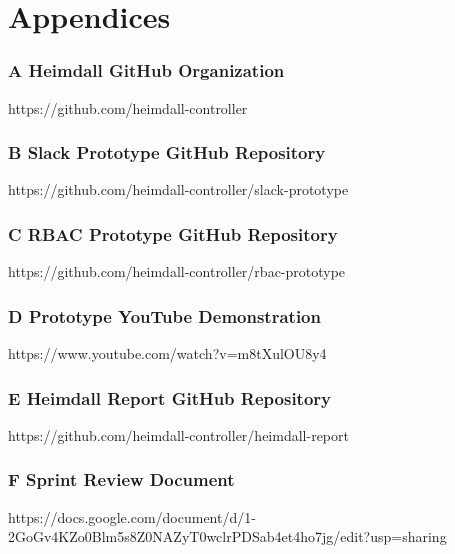 \documentclass{article}
\begin{document}
\clearpage
\section*{Appendices}
\subsubsection*{A Heimdall GitHub Organization} \label{appendix-a}
\hypertarget{appendix-a}{https://github.com/heimdall-controller}

\subsubsection*{B Slack Prototype GitHub Repository} 
\hypertarget{appendix-b}{https://github.com/heimdall-controller/slack-prototype}

\subsubsection*{C RBAC Prototype GitHub Repository} 
\hypertarget{appendix-c}{https://github.com/heimdall-controller/rbac-prototype}

\subsubsection*{D Prototype YouTube Demonstration} \label{appendix-d}
\hypertarget{appendix-d}{https://www.youtube.com/watch?v=m8tXulOU8y4}

\subsubsection*{E Heimdall Report GitHub Repository} \label{appendix-e}
\hypertarget{appendix-e}{https://github.com/heimdall-controller/heimdall-report}

\subsubsection*{F Sprint Review Document} \label{appendix-f}
\hypertarget{appendix-f}{https://docs.google.com/document/d/1-2GoGv4KZo0Blm5s8Z0NAZyT0wclrPDSab4et4ho7jg/edit?usp=sharing}
\end{document}
